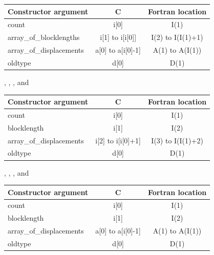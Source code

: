 \begin{description}[style=unboxed,leftmargin=0cm]
\begin{center}
\begin{tabular}{l c c}
\hline
Constructor argument &          C &                    Fortran location                \\
\hline
count                   &       i[0] &                          I(1)                            \\
array\_of\_blocklengths &       i[1] to i[i[0]] &               I(2) to I(I(1)+1)               \\
array\_of\_displacements &      a[0] to a[i[0]-1] &             A(1) to A(I(1))                 \\
oldtype &                       d[0] &                          D(1)                            \\
\hline
\end{tabular}
\end{center}

\item[\mpiconstmain{MPI\_COMBINER\_INDEXED\_BLOCK}]
, , , and

\begin{center}
\begin{tabular}{l c c}
\hline
Constructor argument &          C &                    Fortran location                \\
\hline
count                   &       i[0] &                          I(1)                            \\
blocklength             &       i[1] &                          I(2)                            \\
array\_of\_displacements &      i[2] to i[i[0]+1] &             I(3) to I(I(1)+2)    \\
oldtype &                       d[0] &                          D(1)                            \\
\hline
\end{tabular}
\end{center}

\item[\mpiconstmain{MPI\_COMBINER\_HINDEXED\_BLOCK}]
, , , and

\begin{center}
\begin{tabular}{l c c}
\hline
Constructor argument &          C &                    Fortran location                \\
\hline
count                   &       i[0] &                          I(1)                            \\
blocklength             &       i[1] &                          I(2)                            \\
array\_of\_displacements &      a[0] to a[i[0]-1] &             A(1) to A(I(1))                 \\
oldtype &                       d[0] &                          D(1)                            \\
\hline
\end{tabular}
\end{center}


\end{description}
